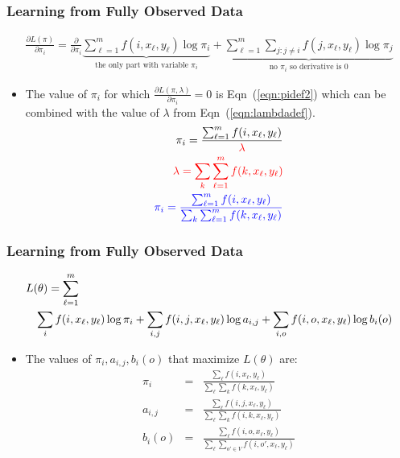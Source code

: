 \begin{frame}
\frametitle{Learning from Fully Observed Data}
{\small\begin{eqnarray*} \frac{\partial L(\pi)}{\partial \pi_i} = \frac{\partial }{\partial \pi_i} \underbrace{\sum_{\ell=1}^m f(i,x_\ell,y_\ell) \log \pi_i}_{\textrm{the only part with variable $\pi_i$}} + \underbrace{\sum_{\ell=1}^m \sum_{j : j \neq i}  f(j,x_\ell,y_\ell) \log \pi_j}_{\textrm{no $\pi_i$ so derivative is $0$}} \end{eqnarray*}}
\begin{itemize}[<+->]
\item The value of $\pi_i$ for which $\frac{\partial L(\pi, \lambda)}{\partial \pi_i} = 0$ is Eqn~(\ref{eqn:pidef2}) which can be combined with the value of $\lambda$ from Eqn~(\ref{eqn:lambdadef}).
\begin{eqnarray}
\pi_i = \frac{\sum_{\ell=1}^m f(i, x_\ell, y_\ell)}{\textcolor{red}{\lambda}} \label{eqn:pidef2} \\
\textcolor{red}{\lambda = \sum_k \sum_{\ell=1}^m f(k, x_\ell, y_\ell)} \label{eqn:lambdadef} \\
\textcolor{blue}{\pi_i = \frac{\sum_{\ell=1}^m f(i, x_\ell, y_\ell)}{\sum_k \sum_{\ell=1}^m f(k, x_\ell, y_\ell)}}  \nonumber
\end{eqnarray}
\end{itemize}
\end{frame}

\begin{frame}
\frametitle{Learning from Fully Observed Data}
{\small\begin{eqnarray*}
\lefteqn{L(\theta) = \sum_{\ell=1}^m  } \\
&& \sum_i f(i,x_\ell,y_\ell) \log \pi_i + \sum_{i,j} f(i,j,x_\ell,y_\ell) \log a_{i,j} + \sum_{i,o} f(i,o,x_\ell,y_\ell) \log b_i(o) \end{eqnarray*}}
\begin{itemize}[<+->]
\item The values of $\pi_i, a_{i,j}, b_i(o)$ that maximize $L(\theta)$ are:
\begin{eqnarray*}
\pi_i & = & \frac{\sum_\ell f(i,x_\ell,y_\ell)}{\sum_\ell \sum_k f(k,x_\ell,y_\ell)} \\
a_{i,j} & = & \frac{\sum_\ell f(i,j,x_\ell,y_\ell)}{\sum_\ell \sum_k f(i,k,x_\ell,y_\ell)} \\
b_i(o) & = & \frac{\sum_\ell f(i,o,x_\ell,y_\ell)}{\sum_\ell \sum_{o' \in V} f(i,o',x_\ell,y_\ell)} 
\end{eqnarray*}
\end{itemize}
\end{frame}

